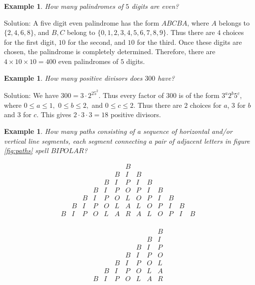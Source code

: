\documentclass[11pt, openany]{book}
\theoremstyle{change} \theoremheaderfont{\blue\sffamily\bfseries}
\newtheorem{exa}[thm]{Example}
\theoremstyle{nonumberplain} \theoremheaderfont{\sffamily\bfseries}
\newcommand{\í}{\'{\i}}
\begin{document}
\begin{exa}\label{exa:5digit_even_palindromes} How many palindromes of $5$ digits are even? \end{exa}
Solution: A five digit even palindrome has the form $ABCBA$, where
$A$ belongs to $ \{2, 4, 6, 8\}$, and $B,C$ belong to
$\{0,1,2,3,4,5,6,7,8,9\}$. Thus there are $4$ choices for the first
digit, $10$ for the second, and $10$ for the third. Once these
digits are chosen, the palindrome is completely determined.
Therefore, there are $4\times 10 \times 10 = 400$ even palindromes
of $5$ digits.
\begin{exa} How many positive divisors does $300$
have? \end{exa}Solution: We have $300 = 3\cdot 2^25^2$. Thus every
factor of $300$ is of the form $3^a2^b5^c $, where $0 \leq a \leq
1,$ $0 \leq b \leq 2,$ and $0 \leq c \leq 2$. Thus there are $2$
choices for $a$, $3$ for $b$ and $3$ for $c$. This gives $2\cdot 3
\cdot 3 = 18$ positive divisors.
\begin{exa}
\label{pro:paths}How many paths consisting of a sequence of
horizontal and/or vertical line segments, each segment connecting a
pair of adjacent letters in figure \ref{fig:paths} spell $BIPOLAR$?
\end{exa}
\begin{figure}[h]
\begin{minipage}{7cm}$$
\begin{array}{ccccccccccccc}
 &  & &  &  &  & B &  &  &  &  &  &  \\
 &  & &  &  & B & I & B &  &  &  &  &  \\
 &  & &  & B & I & P & I & B &  &  &  &  \\
 &  & & B & I & P & O & P & I & B &  &  &  \\
 &  & B& I & P & O & L & O & P & I & B &  &  \\
& B & I& P & O & L & A & L & O & P & I & B &  \\
B & I & P& O & L & A & R & A & L & O & P & I & B \\    \end{array}
$$
 \footnotesize{}\label{fig:paths}
\end{minipage}
\hfill
\begin{minipage}{7cm}
$$
\begin{array}{ccccccc}
 &  & &  &  &  & B  \\
 &  & &  &  & B & I   \\
 &  & &  & B & I & P   \\
 &  & & B & I & P & O  \\
 &  & B& I & P & O & L   \\
& B & I& P & O & L & A  \\
B & I & P& O & L & A & R  \\    \end{array}
$$
 \footnotesize{}\label{fig:paths2}
\end{minipage}
\end{figure}
\end{document}
